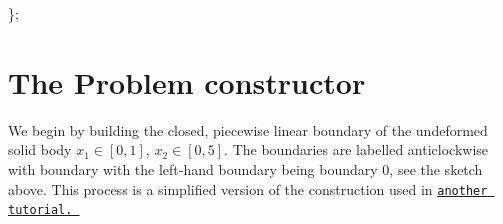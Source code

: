 \begin{DoxyCodeInclude}
\};

\end{DoxyCodeInclude}




 

\hypertarget{index_constructor}{}\section{The Problem constructor}\label{index_constructor}
We begin by building the closed, piecewise linear boundary of the undeformed solid body $ x_{1} \in [0,1] $, $ x_{2} \in [0,5]. $ The boundaries are labelled anticlockwise with boundary with the left-\/hand boundary being boundary 0, see the sketch above. This process is a simplified version of the construction used in \href{../../../../doc/meshes/mesh_from_inline_triangle/html/index.html}{\tt another tutorial. }

